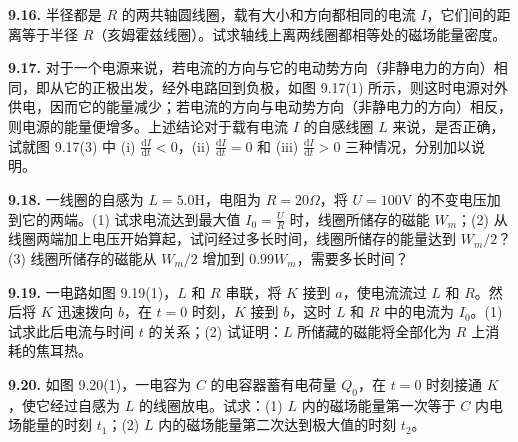 \vfill
\newpage

\textbf{9.16.} 半径都是 $R$ 的两共轴圆线圈，载有大小和方向都相同的电流 $I$，它们间的距离等于半径 $R$（亥姆霍兹线圈）。试求轴线上离两线圈都相等处的磁场能量密度。

\vfill
\newpage

\textbf{9.17.} 对于一个电源来说，若电流的方向与它的电动势方向（非静电力的方向）相同，即从它的正极出发，经外电路回到负极，如图 9.17(1) 所示，则这时电源对外供电，因而它的能量减少；若电流的方向与电动势方向（非静电力的方向）相反，则电源的能量便增多。上述结论对于载有电流 $I$ 的自感线圈 $L$ 来说，是否正确，试就图 9.17(3) 中 (i) $\displaystyle \frac{\mathrm{d}I}{\mathrm{d}t} < 0$，(ii) $\displaystyle \frac{\mathrm{d}I}{\mathrm{d}t} = 0$ 和 (iii) $\displaystyle \frac{\mathrm{d}I}{\mathrm{d}t} > 0$ 三种情况，分别加以说明。

\begin{center}
  \begin{minipage}[b]{0.30\linewidth}
    \centering
  \end{minipage}\hfill
  \begin{minipage}[b]{0.66\linewidth}
    \centering
  \end{minipage}
\end{center}

\vfill
\newpage

\textbf{9.18.} 一线圈的自感为 $L = 5.0\mathrm{H}$，电阻为 $R = 20\Omega$，将 $U = 100\mathrm{V}$ 的不变电压加到它的两端。(1) 试求电流达到最大值 $\displaystyle I_0 = \frac{U}{R}$ 时，线圈所储存的磁能 $W_m$；(2) 从线圈两端加上电压开始算起，试问经过多长时间，线圈所储存的能量达到 $W_m / 2$？(3) 线圈所储存的磁能从 $W_m / 2$ 增加到 $0.99W_m$，需要多长时间？

\vfill
\newpage

\textbf{9.19.} 一电路如图 9.19(1)，$L$ 和 $R$ 串联，将 $K$ 接到 $a$，使电流流过 $L$ 和 $R$。然后将 $K$ 迅速拨向 $b$，在 $t = 0$ 时刻，$K$ 接到 $b$，这时 $L$ 和 $R$ 中的电流为 $I_{0}$。(1) 试求此后电流与时间 $t$ 的关系；(2) 试证明：$L$ 所储藏的磁能将全部化为 $R$ 上消耗的焦耳热。

\begin{center}
\end{center}

\vfill
\newpage

\textbf{9.20.} 如图 9.20(1)，一电容为 $C$ 的电容器蓄有电荷量 $Q_{0}$，在 $t = 0$ 时刻接通 $K$，使它经过自感为 $L$ 的线圈放电。试求：(1) $L$ 内的磁场能量第一次等于 $C$ 内电场能量的时刻 $t_{1}$；(2) $L$ 内的磁场能量第二次达到极大值的时刻 $t_{2}$。

